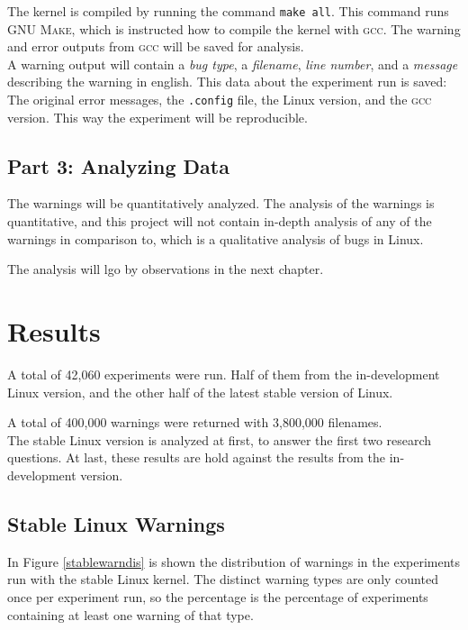 \documentclass[a4paper,11pt]{report}
\newcommand{\textcode}[1]{\fboxsep=1pt\texttt{\colorbox{gray!20}{#1}}}
\begin{document}
The kernel is compiled by running the command \textcode{make all}. This command 
runs \textsc{GNU Make}, which is instructed how to compile the kernel with 
\textsc{gcc}. The warning and error outputs from \textsc{gcc} will be saved for analysis.
\\

A warning output will contain a \emph{bug type}, a \emph{filename}, \emph{line 
number}, and a \emph{message} describing the warning in english. This data about the
experiment run is saved: The original error messages, the \texttt{.config} file, 
the Linux version, and the \textsc{gcc} version.
This way the experiment will be reproducible.






            \section{Part 3: Analyzing Data}
The warnings will be quantitatively analyzed.  The analysis of the warnings is 
 quantitative, and this project will not contain in-depth analysis of 
any of the warnings in comparison to\cite{42bugs}, which is a qualitative 
analysis of bugs in Linux.

The analysis will lgo by observations in the next chapter.


\newpage
\chapter{Results}

A total of 42,060 experiments were run. Half of them from the in-development 
Linux version, and the other half of the latest stable version of Linux.

A total of 400,000 warnings were returned with 3,800,000 filenames.
\\

The stable Linux version is analyzed at first, to answer the first two research 
questions. At last, these results are hold against the results from the 
in-development version.


            \section{Stable Linux Warnings}
In Figure \ref{stablewarndis} is shown the distribution of warnings in the 
experiments run with the stable Linux kernel. The distinct warning types are 
only counted once per experiment run, so the percentage is the percentage of experiments containing at least one
warning of that type.
\end{document}
